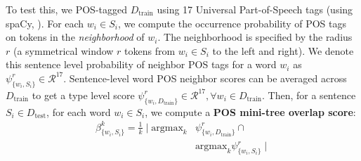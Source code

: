 \documentclass[letterpaper, 12pt]{report}
\begin{document}
To test this, we POS-tagged $D_{\text{train}}$ using 17 Universal Part-of-Speech tags (using spaCy, \citealt{spacy}). %
For each $w_i \in S_i$, we compute the occurrence probability of POS tags on tokens in the \textit{neighborhood} of $w_i$. The neighborhood is specified by the radius $r$ (a symmetrical window $r$ tokens from $w_i \in S_i$ to the left and right). We denote this sentence level probability of neighbor POS tags for a word $w_i$ as $\psi^r_{\{w_i, S_i\}} \in \mathcal{R}^{17}$. Sentence-level word POS neighbor scores can be averaged across $ D_{\text{train}}$ to get a type level score $\psi^r_{\{w_i, D_{\text{train}}\}} \in \mathcal{R}^{17}, \forall w_i \in D_{\text{train}}$.  Then, for a sentence $S_i \in D_{\text{test}}$, for each word $w_i \in S_i$, we compute a \textbf{POS mini-tree overlap score}:
\begin{equation} %
\begin{split}
\beta^k_{\{w_i,S_i\}} =
\frac{1}{k} \mid \text{argmax}_k &\psi^r_{\{w_i, D_{\text{train}}\}} \cap \\ &\text{argmax}_k\psi^r_{\{w_i, S_i\}} \mid
\end{split}
\end{equation}
\end{document}
